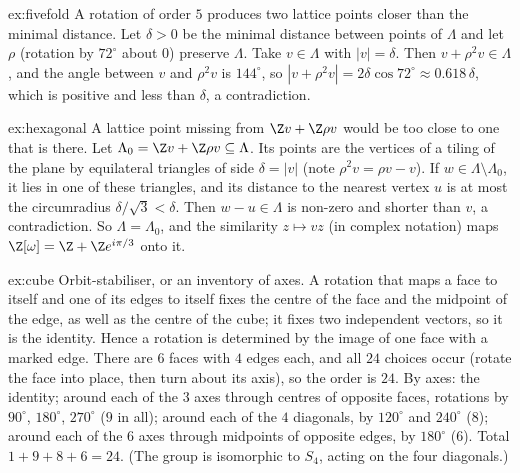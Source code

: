 \begin{solution}{ex:fivefold}
\idea A rotation of order $5$ produces two lattice points closer than the minimal distance.
\writeup Let $\delta>0$ be the minimal distance between points of $\Lambda$ and let $\rho$ (rotation by $72^\circ$ about $0$) preserve $\Lambda$.
Take $v\in\Lambda$ with $|v|=\delta$. Then $v+\rho^2v\in\Lambda$, and the angle between $v$ and $\rho^2v$ is $144^\circ$, so
$|v+\rho^2v|=2\delta\cos72^\circ\approx0.618\,\delta$, which is positive and less than $\delta$, a contradiction.
\end{solution}

\begin{solution}{ex:hexagonal}
\idea A lattice point missing from $\Z v+\Z\rho v$ would be too close to one that is there.
\writeup Let $\Lambda_0=\Z v+\Z\rho v\subseteq\Lambda$. Its points are the vertices of a tiling of the plane by equilateral triangles of side
$\delta=|v|$ (note $\rho^2v=\rho v-v$). If $w\in\Lambda\setminus\Lambda_0$, it lies in one of these triangles, and its distance to the
nearest vertex $u$ is at most the circumradius $\delta/\sqrt3<\delta$. Then $w-u\in\Lambda$ is non-zero and shorter than $v$, a contradiction.
So $\Lambda=\Lambda_0$, and the similarity $z\mapsto vz$ (in complex notation) maps $\Z[\omega]=\Z+\Z e^{i\pi/3}$ onto it.
\end{solution}

\begin{solution}{ex:cube}
\idea Orbit-stabiliser, or an inventory of axes.
\writeup A rotation that maps a face to itself and one of its edges to itself fixes the centre of the face and the midpoint of the edge,
as well as the centre of the cube; it fixes two independent vectors, so it is the identity. Hence a rotation is determined by the
image of one face with a marked edge. There are $6$ faces with $4$ edges each, and all $24$ choices occur (rotate the face into place,
then turn about its axis), so the order is $24$. By axes: the identity; around each of the $3$
axes through centres of opposite faces, rotations by $90^\circ$, $180^\circ$, $270^\circ$ ($9$ in all); around each of the $4$ diagonals, by
$120^\circ$ and $240^\circ$ ($8$); around each of the $6$ axes through midpoints of opposite edges, by $180^\circ$ ($6$). Total
$1+9+8+6=24$. (The group is isomorphic to $S_4$, acting on the four diagonals.)
\end{solution}

